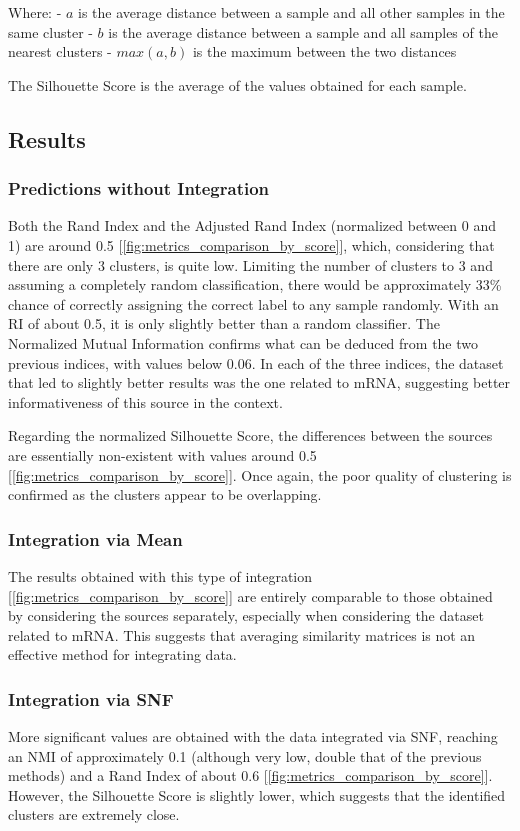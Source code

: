 \documentclass[12pt,a4paper]{article}
\begin{document}
Where:
- $a$ is the average distance between a sample and all other samples in the same cluster
- $b$ is the average distance between a sample and all samples of the nearest clusters
- $max(a, b)$ is the maximum between the two distances

The Silhouette Score is the average of the values obtained for each sample.

\subsection{Results}
\subsubsection{Predictions without Integration}
Both the Rand Index and the Adjusted Rand Index (normalized between 0 and 1) are around 0.5 [\ref{fig:metrics_comparison_by_score}], which, considering that there are only 3 clusters, is quite low. Limiting the number of clusters to 3 and assuming a completely random classification, there would be approximately 33\% chance of correctly assigning the correct label to any sample randomly. With an RI of about 0.5, it is only slightly better than a random classifier.
The Normalized Mutual Information confirms what can be deduced from the two previous indices, with values below 0.06. In each of the three indices, the dataset that led to slightly better results was the one related to mRNA, suggesting better informativeness of this source in the context.

Regarding the normalized Silhouette Score, the differences between the sources are essentially non-existent with values around 0.5 [\ref{fig:metrics_comparison_by_score}]. Once again, the poor quality of clustering is confirmed as the clusters appear to be overlapping.

\subsubsection{Integration via Mean}
The results obtained with this type of integration [\ref{fig:metrics_comparison_by_score}] are entirely comparable to those obtained by considering the sources separately, especially when considering the dataset related to mRNA. This suggests that averaging similarity matrices is not an effective method for integrating data.

\subsubsection{Integration via SNF}
More significant values are obtained with the data integrated via SNF, reaching an NMI of approximately 0.1 (although very low, double that of the previous methods) and a Rand Index of about 0.6 [\ref{fig:metrics_comparison_by_score}]. However, the Silhouette Score is slightly lower, which suggests that the identified clusters are extremely close.
\end{document}
